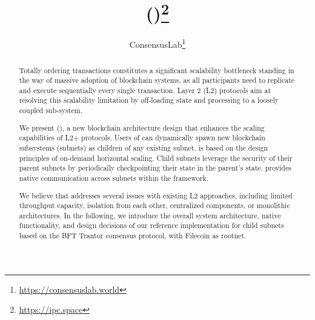 \documentclass[11pt,a4paper]{article}
\begin{document}
\title{\ipcFull (\ipc)\thanks{\url{https://ipc.space}}}
\date{}
\author{ConsensusLab\thanks{\url{https://consensuslab.world}}}

\maketitle
\begin{abstract}
Totally ordering transactions constitutes a
significant scalability bottleneck standing in the way of massive adoption of
blockchain systems, as all participants need to replicate and execute sequentially every single transaction. Layer 2 (L2) protocols aim at resolving this scalability
limitation by off-loading state and processing to a loosely coupled sub-system.

We present \ipcFull (\ipc), a new blockchain
architecture design that enhances the scaling capabilities of L2+
protocols. Users of \ipc can dynamically spawn new blockchain subsystems
(subnets) as children of any existing subnet.  \ipc is based on the design principles of
on-demand horizontal scaling. Child subnets leverage the
security of their parent subnets by periodically checkpointing their state in the parent's state.
\ipc provides native communication across
subnets within the \ipc framework.

We believe that \ipc addresses several issues with existing L2 approaches,
including limited throughput capacity, isolation from each
other, centralized components, or monolithic architectures.
In the following, we introduce the overall system architecture, native functionality,
and design decisions of our reference implementation for child
subnets based on the BFT Trantor consensus protocol, with Filecoin as
rootnet.
\end{abstract}










 
\end{document}
